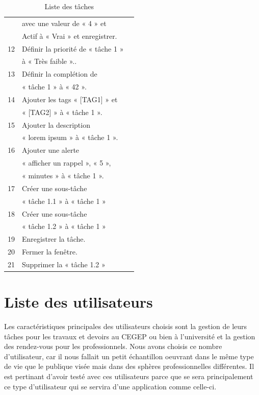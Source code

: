 \documentclass[letterpaper, oneside, 12pt, these, creativecommons]{thETS}
\begin{document}
\begin{table}
\begin{tabular}{|l|l|l|}
				& avec une valeur de « 4 » et 	&							\\
				& Actif à « Vrai » et enregistrer.	&							\\ \hline
		12		& Définir la priorité de  « tâche 1 »&							\\
				&  à « Très faible »..		&							\\ \hline
		13		& Définir la complétion de 		&							\\
				& « tâche 1 » à « 42 ».		&							\\ \hline
		14		& Ajouter les tags « [TAG1] » et 	&							\\
				& « [TAG2] » à « tâche 1 ».	&							\\ \hline
		15		& Ajouter la description 		&							\\
				& « lorem ipsum » à « tâche 1 ».	&							\\ \hline
		16		& Ajouter une alerte 	 	&							\\
				& « afficher un rappel », « 5 »,	& 							\\
				&  « minutes » à « tâche 1 ».	&							\\ \hline
		17		& Créer une sous-tâche		&							\\
				&  « tâche 1.1 » à « tâche 1 »	&							\\ \hline
		18		& Créer une sous-tâche		&							\\
				&  « tâche 1.2 » à « tâche 1 »	&							\\ \hline
		19		& Enregistrer la tâche.		& 							\\ \hline
		20		& Fermer la fenêtre.		&							\\ \hline
		21		& Supprimer la « tâche 1.2 »	&							\\ \hline
	\end{tabular}
	\caption{Liste des tâches}
\end{table}

\section{Liste des utilisateurs}

Les caractéristiques principales des utilisateurs choisis sont la gestion de leurs tâches pour les travaux et devoirs au CEGEP ou bien à l'université et la gestion des rendez-vous pour les professionnels. Nous avons choisis ce nombre d'utilisateur, car il nous fallait un petit échantillon oeuvrant dans le même type de vie que le publique visée mais dans des sphères professionnelles différentes. Il est pertinant d'avoir testé avec ces utilisateurs parce que se sera principalement ce type d'utilisateur qui se servira d'une application comme celle-ci.
\end{document}
